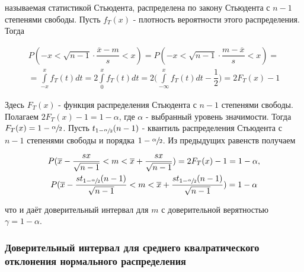 \noindent называемая статистикой Стьюдента, распределена по закону Стьюдента с $n-1$ степенями свободы. Пусть $f_{T}(x)$ - плотность вероятности этого распределения. Тогда 

\begin{multline*}
    P(-x < \sqrt{n - 1}\cdot \dfrac{\overline{x} - m}{s} < x) = P(-x < \sqrt{n - 1}\cdot \dfrac{m - \overline{x}}{s} < x) = \\ =\int \limits_{-x}^{x}f_{T}(t)dt = 2\int \limits_{0}^{x}f_{T}(t)dt = 2\Bigg(\int \limits_{-\infty}^{x}f_{T}(t)dt - \dfrac{1}{2}\Bigg) = 2F_{T}(x) - 1
\end{multline*}

\noindent Здесь  $F_{T}(x)$ - функция распределения Стьюдента с $n-1$ степенями свободы.\\
Полагаем $2F_{T}(x) - 1 = 1 - \alpha$, где $\alpha$ - выбранный уровень значимости. Тогда $F_{T}(x) = 1 - \sfrac{\alpha}{2}$. Пусть $t_{1 - \sfrac{\alpha}{2}}(n-1)$ - квантиль распределения Стьюдента с $n-1$ степенями свободы и порядка $1 - \sfrac{\alpha}{2}$. Из предыдущих равенств получаем

\begin{multline}
    P(\overline{x} - \dfrac{sx}{\sqrt{n - 1}} < m < \overline{x} + \dfrac{sx}{\sqrt{n - 1}}) = 2F_{T}(x) - 1 = 1 - \alpha, \\
    P(\overline{x} - \dfrac{st_{1 - \sfrac{\alpha}{2}}(n-1)}{\sqrt{n - 1}} < m < \overline{x} + \dfrac{st_{1 - \sfrac{\alpha}{2}}(n-1)}{\sqrt{n - 1}}) = 1 - \alpha
    \label{eq16}
\end{multline}

 \noindent что и даёт доверительный интервал для $m$ с доверительной верятностью $\gamma = 1 - \alpha$. 
        






\subsubsection{Доверительный интервал для среднего квалратического отклонения нормального распределения}

